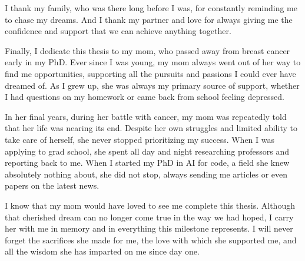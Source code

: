 I thank my family, who was there long before I was, for constantly reminding me to chase my dreams. And I thank my partner and love for always giving me the confidence and support that we can achieve anything together.

Finally, I dedicate this thesis to my mom, who passed away from breast cancer early in my PhD. Ever since I was young, my mom always went out of her way to find me opportunities, supporting all the pursuits and passions I could ever have dreamed of. As I grew up, she was always my primary source of support, whether I had questions on my homework or came back from school feeling depressed.

In her final years, during her battle with cancer, my mom was repeatedly told that her life was nearing its end. Despite her own struggles and limited ability to take care of herself, she never stopped prioritizing my success. When I was applying to grad school, she spent all day and night researching professors and reporting back to me. When I started my PhD in AI for code, a field she knew absolutely nothing about, she did not stop, always sending me articles or even papers on the latest news.

I know that my mom would have loved to see me complete this thesis. Although that cherished dream can no longer come true in the way we had hoped, I carry her with me in memory and in everything this milestone represents. I will never forget the sacrifices she made for me, the love with which she supported me, and all the wisdom she has imparted on me since day one.
